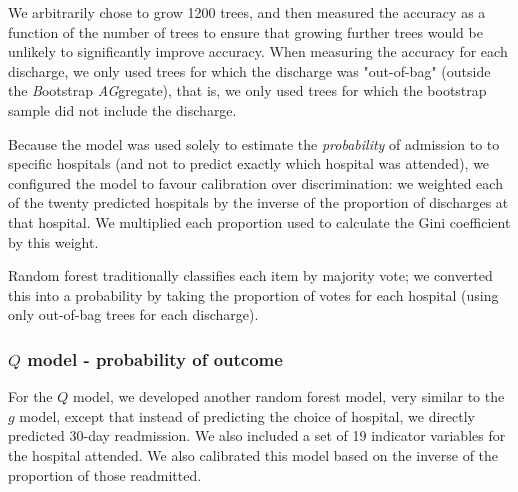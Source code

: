 \documentclass[]{article}\usepackage[]{graphicx}\usepackage[]{color}
\begin{document}
We arbitrarily chose to grow 1200 trees, and then measured the accuracy as a function of the number of trees to ensure that growing further trees would be unlikely to significantly improve accuracy. When measuring the accuracy for each discharge, we only used trees for which the discharge was "out-of-bag" (outside the \emph{B}ootstrap \emph{AG}gregate), that is, we only used trees for which the bootstrap sample did not include the discharge.

 
Because the model was used solely to estimate the \emph{probability} of admission to to specific hospitals (and not to predict exactly which hospital was attended), we configured the model to favour calibration over discrimination: we weighted each of the twenty predicted hospitals by the inverse of the proportion of discharges at that hospital. We multiplied each proportion used to calculate the Gini coefficient by this weight.

Random forest traditionally classifies each item by majority vote; we converted this into a probability by taking the proportion of votes for each hospital (using only out-of-bag trees for each discharge).

\subsubsection{\(Q\) model - probability of outcome}
For the  \(Q\) model, we developed another random forest model, very similar to the \(g\) model, except that instead of predicting the choice of hospital, we directly predicted 30-day readmission. We also included a set of 19 indicator variables for the hospital attended. We also calibrated this model based on the inverse of the proportion of those readmitted.
\end{document}
